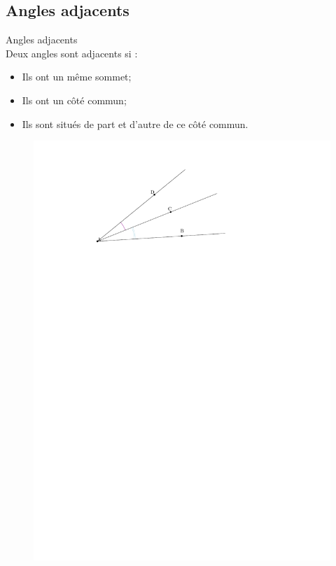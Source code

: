 \documentclass[12pt]{article}
\begin{document}
\subsection*{Angles adjacents}
\begin{multicols}{2}

  \begin{Definition}{Angles adjacents}\\
    Deux angles sont adjacents si :
    \begin{itemize}
    \item Ils ont un même sommet;
    \item Ils ont un côté commun;
    \item Ils sont situés de part et d'autre de ce côté commun.
    \end{itemize}
  \end{Definition}

  \begin{figure}[H]
    \centering
    \includegraphics[width=0.8\linewidth]{5x10-angles/sources/adjacents.pdf}
  \end{figure}
\end{multicols}
\end{document}
